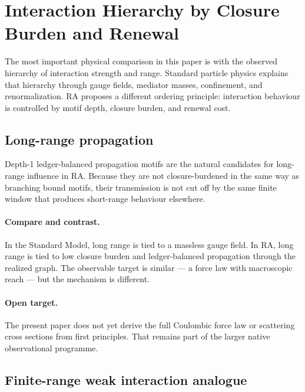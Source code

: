 \documentclass[11pt]{article}
\begin{document}
\section{Interaction Hierarchy by Closure Burden and Renewal}

The most important physical comparison in this paper is with the observed hierarchy of interaction strength and range. Standard particle physics explains that hierarchy through gauge fields, mediator masses, confinement, and renormalization. RA proposes a different ordering principle: interaction behaviour is controlled by motif depth, closure burden, and renewal cost.

\subsection{Long-range propagation}

Depth-1 ledger-balanced propagation motifs are the natural candidates for long-range influence in RA. Because they are not closure-burdened in the same way as branching bound motifs, their transmission is not cut off by the same finite window that produces short-range behaviour elsewhere.

\paragraph{Compare and contrast.} In the Standard Model, long range is tied to a massless gauge field. In RA, long range is tied to low closure burden and ledger-balanced propagation through the realized graph. The observable target is similar --- a force law with macroscopic reach --- but the mechanism is different.

\paragraph{Open target.} The present paper does not yet derive the full Coulombic force law or scattering cross sections from first principles. That remains part of the larger native observational programme.

\subsection{Finite-range weak interaction analogue}
\end{document}
